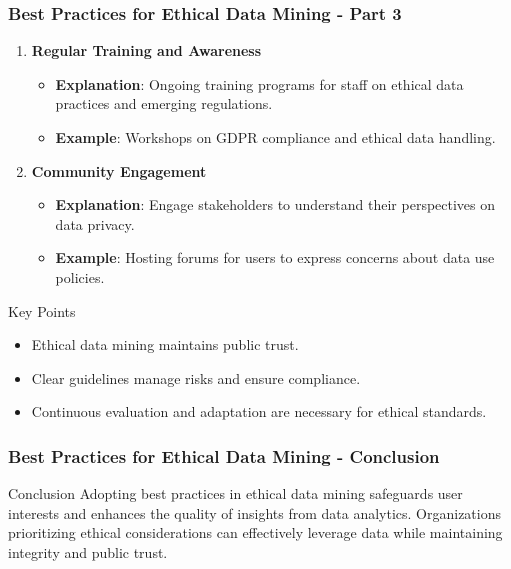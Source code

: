 \documentclass{beamer}
\begin{document}
\begin{frame}[fragile]
    \frametitle{Best Practices for Ethical Data Mining - Part 3}
    \begin{enumerate}[resume]
        \item \textbf{Regular Training and Awareness}
        \begin{itemize}
            \item \textbf{Explanation}: Ongoing training programs for staff on ethical data practices and emerging regulations.
            \item \textbf{Example}: Workshops on GDPR compliance and ethical data handling.
        \end{itemize}

        \item \textbf{Community Engagement}
        \begin{itemize}
            \item \textbf{Explanation}: Engage stakeholders to understand their perspectives on data privacy.
            \item \textbf{Example}: Hosting forums for users to express concerns about data use policies.
        \end{itemize}
    \end{enumerate}

    \begin{block}{Key Points}
        \begin{itemize}
            \item Ethical data mining maintains public trust.
            \item Clear guidelines manage risks and ensure compliance.
            \item Continuous evaluation and adaptation are necessary for ethical standards.
        \end{itemize}
    \end{block}
\end{frame}

\begin{frame}[fragile]
    \frametitle{Best Practices for Ethical Data Mining - Conclusion}
    \begin{block}{Conclusion}
        Adopting best practices in ethical data mining safeguards user interests and enhances the quality of insights from data analytics. Organizations prioritizing ethical considerations can effectively leverage data while maintaining integrity and public trust.
    \end{block}
\end{frame}
\end{document}

